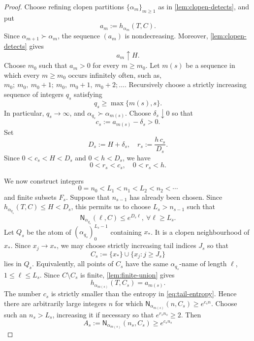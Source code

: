 \documentclass[12pt,letterpaper,reqno]{amsart}
\newcommand{\Nname}{\mathsf N}
\theoremstyle{definition}
\theoremstyle{remark}
\numberwithin{equation}{section}
\begin{document}
	\begin{proof}
		Choose refining clopen partitions $\{\alpha_m\}_{m\geq1}$ as in
		\cref{lem:clopen-detects}, and put
		\[
		a_m:=h_{\alpha_m}(T,C).
		\]
		Since $\alpha_{m+1}\succ \alpha_m$, the sequence $(a_m)$ is
		nondecreasing.  Moreover, \cref{lem:clopen-detects} gives
		\begin{equation}
			a_m\uparrow H.
			\label{eq:am-to-H}
		\end{equation}
		Choose $m_0$ such that $a_m>0$ for every $m\geq m_0$.  Let $m(s)$ be a
		sequence in which every $m\geq m_0$ occurs infinitely often, such as, $m_0;~m_0,~ m_0+1;~ m_0,~ m_0+1,~ m_0+2; \dots$.  Recursively
		choose a strictly increasing sequence of integers $q_s$ satisfying
		\begin{equation}
			q_s\geq\max\{m(s),s\}.
			\label{eq:qs-choice}
		\end{equation}
		In particular, $q_s\to\infty$, and $\alpha_{q_s}\succ \alpha_{m(s)}$.  Choose $\delta_s\downarrow0$ so that
		\[
		c_s:=a_{m(s)}-\delta_s>0.
		\]
		Set
		\begin{equation}
			D_s:=H+\delta_s,
			\quad
			r_s:=\frac{h\,c_s}{D_s}.
			\label{eq:csr}
		\end{equation}
		Since $0<c_s<H<D_s$ and $0<h<D_s$, we have
		\begin{equation}
			0<r_s<c_s,
			\quad 0<r_s<h.
			\label{eq:rs-bounds}
		\end{equation}
		
		We now construct integers
		\[
		0=n_0<L_1<n_1<L_2<n_2<\cdots
		\]
		and finite subsets $F_s$.  Suppose that $n_{s-1}$ has already been
		chosen.  Since $h_{\alpha_{q_s}}(T,C)\leq H<D_s$, this permits us to choose $L_s>n_{s-1}$ such that
		\begin{equation}
			\Nname_{\alpha_{q_s}}(\ell,C)
			\leq e^{D_s\ell},~ \forall\ell\geq L_s.
			\label{eq:fine-upper}
		\end{equation}
		Let $Q_s$ be the atom of $(\alpha_{q_s})_0^{L_s-1}$ containing $x_*$.  It
		is a clopen neighbourhood of $x_*$.  Since $x_j\to x_*$, we may choose
		strictly increasing tail indices $J_s$ so that
		\[
		C_s:=\{x_*\}\cup\{x_j:j\geq J_s\}
		\]
		lies in $Q_s$.  Equivalently, all points of $C_s$ have the same
		$\alpha_{q_s}$-name of length $\ell$, $1\leq \ell\leq L_s$.  Since $C\setminus C_s$ is
		finite, \cref{lem:finite-union} gives
		\begin{equation}
			h_{\alpha_{m(s)}}(T,C_s)=a_{m(s)}.
			\label{eq:tail-entropy}
		\end{equation}
		The number $c_s$ is strictly smaller than the entropy in
		\eqref{eq:tail-entropy}.  Hence there are arbitrarily large integers $n$
		for which $\Nname_{\alpha_{m(s)}}(n,C_s)\geq e^{c_sn}$.  Choose such an
		$n_s>L_s$, increasing it if necessary so that $e^{r_sn_s}\geq2$.  Then
		\begin{equation}
			A_s:=\Nname_{\alpha_{m(s)}}(n_s,C_s)
			\geq e^{c_sn_s}
			\label{eq:coarse-lower}
		\end{equation}
		

\end{proof}
\end{document}

